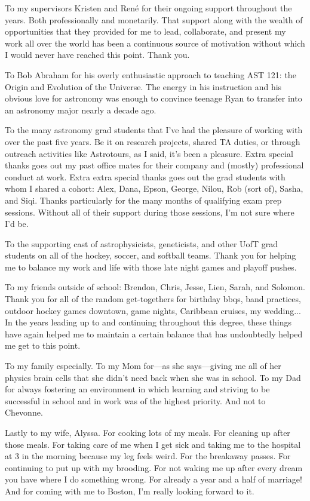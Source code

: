 To my supervisors Kristen and Ren\'e for their ongoing support throughout the
years. Both professionally and monetarily. That support along with the wealth
of opportunities that they provided for me to lead, collaborate, and
present my work all over the world has been a continuous source of motivation
without which I would never have reached this point. Thank you.

To Bob Abraham for his overly enthusiastic approach to teaching AST
121: the Origin and Evolution of the Universe. The energy in his instruction
and his obvious love for astronomy was enough to convince teenage Ryan to
transfer into an astronomy major nearly a decade ago. 

To the many astronomy grad students that I've had the pleasure of working with
over the past five years. Be it on research projects, shared TA duties, or
through outreach activities like Astrotours, as I said, it's been a pleasure.
Extra special thanks goes out my past office mates for their company and
(mostly) professional conduct at work.
Extra extra special thanks goes out the grad students with whom I shared a
cohort: Alex, Dana, Epson,
George, Nilou, Rob (sort of), Sasha, and Siqi. Thanks particularly for the many months
of qualifying exam prep sessions. Without all of their support during those
sessions, I'm not sure where I'd be.

To the supporting cast of
astrophysicists, geneticists, and other UofT grad students on all of the
hockey, soccer, and softball teams. Thank you for helping me to balance my work
and life with those late night games and playoff pushes.

To my friends outside of school: Brendon, Chris, Jesse, Lien, Sarah, and
Solomon.
Thank you for all of the random get-togethers for birthday bbqs, band practices,
outdoor hockey games downtown, game nights, Caribbean cruises, my wedding... 
In the years leading up to and continuing throughout this degree, these things
have again helped me to maintain a certain balance that has undoubtedly helped
me get to this point.

To my family especially. To my Mom for---as she says---giving me all of
her physics
brain cells that she didn't need back when she was in school. To my Dad for
always fostering an environment in which learning and striving to be
successful in school and in work was of the highest priority. And not to
Chevonne.

Lastly to my wife, Alyssa. For cooking lots of my meals. For cleaning up after those
meals. For taking care of me when I get sick and taking me to the hospital at 3
in the morning because my leg feels weird. For the breakaway passes.
For continuing to put up with my brooding. For not waking me up after every
dream you have where I do something wrong. For already a year and a half of
marriage! And for coming with me to Boston, I'm really looking forward to it.
